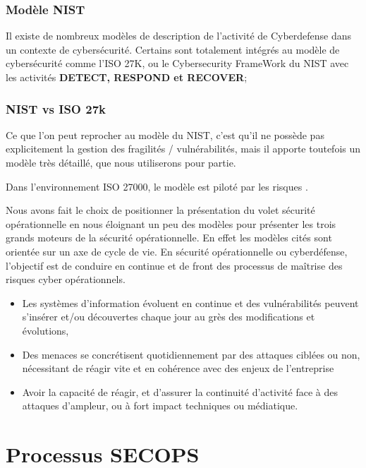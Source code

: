 \begin{frame}
\frametitle<presentation>{Modèle NIST}

Il existe de nombreux modèles de description de l'activité de Cyberdefense dans un contexte de cybersécurité.
Certains sont totalement intégrés au modèle de cybersécurité comme l'ISO 27K, ou le Cybersecurity FrameWork du NIST  avec les activités \textbf{DETECT, RESPOND et RECOVER};
\end{frame}


\begin{frame}
\frametitle<presentation>{NIST vs ISO 27k}
Ce que l'on peut reprocher au modèle du NIST, c'est qu'il ne possède pas explicitement la gestion des fragilités / vulnérabilités, mais il apporte toutefois un modèle très détaillé, que nous utiliserons pour partie.
\end{frame}
Dans l'environnement ISO 27000, le modèle est piloté par les risques .

Nous avons fait le choix de positionner la présentation du volet sécurité opérationnelle en nous éloignant un peu des modèles pour présenter les trois grands moteurs de la sécurité opérationnelle. En effet les modèles cités sont orientée sur un axe de cycle de vie.
En sécurité opérationnelle ou cyberdéfense, l'objectif est de conduire en continue et de front des processus de maîtrise des risques cyber opérationnels.
\begin{itemize}
  \item Les systèmes d'information évoluent en continue et des vulnérabilités peuvent s'insérer et/ou découvertes chaque jour au grès des modifications et évolutions,
  \item Des menaces se concrétisent quotidiennement par des attaques ciblées ou non, nécessitant de réagir vite et en cohérence avec des enjeux de l'entreprise
  \item Avoir la capacité de réagir, et d'assurer la continuité d'activité face à des attaques d'ampleur, ou à fort impact techniques ou médiatique.
\end{itemize}

\newpage
\section{Processus SECOPS}


